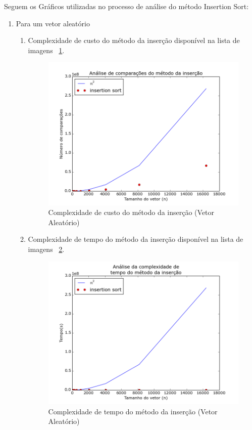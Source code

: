 \documentclass[12pt,a4paper,twoside]{report}
\begin{document}
Seguem os Gráficos utilizadas no processo de análise do método Insertion Sort:
\begin{enumerate}

	\item Para um vetor aleatório
	\begin{enumerate}
		\item Complexidade de custo do método da inserção disponível na lista de imagens ~\ref{fig:InsertionPlot1A}.
		\begin{figure}[!h]
			\centering
			\includegraphics[scale=0.6]{../imagens/Insertion/insertion_plot_1_aleatorio.png}
			\caption{Complexidade de custo do método da inserção (Vetor Aleatório) \label{fig:InsertionPlot1A}}
		\end{figure}


		\item Complexidade de tempo do método da inserção disponível na lista de imagens ~\ref{fig:InsertionPlot2A}.
		\begin{figure}[!h]
			\centering
			\includegraphics[scale=0.6]{../imagens/Insertion/insertion_plot_2_aleatorio.png}
			\caption{Complexidade de tempo do método da inserção (Vetor Aleatório)\label{fig:InsertionPlot2A}}
		\end{figure}



\end{enumerate}
\end{enumerate}
\end{document}
